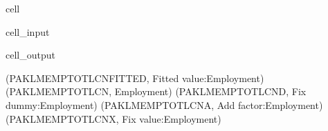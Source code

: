 \documentclass[letterpaper,10pt,english]{jupyterBook}
\begin{document}
\begin{sphinxuseclass}{cell}\begin{sphinxVerbatimInput}

\begin{sphinxuseclass}{cell_input}
\begin{sphinxVerbatim}[commandchars=\\\{\}]
\end{sphinxVerbatim}

\end{sphinxuseclass}\end{sphinxVerbatimInput}
\begin{sphinxVerbatimOutput}

\begin{sphinxuseclass}{cell_output}
\begin{sphinxVerbatim}[commandchars=\\\{\}]
(\PYGZsq{}PAKLMEMPTOTLCN\PYGZus{}FITTED\PYGZsq{}, \PYGZsq{}Fitted  value:Employment\PYGZsq{})
(\PYGZsq{}PAKLMEMPTOTLCN\PYGZsq{}, \PYGZsq{}Employment\PYGZsq{})
(\PYGZsq{}PAKLMEMPTOTLCN\PYGZus{}D\PYGZsq{}, \PYGZsq{}Fix dummy:Employment\PYGZsq{})
(\PYGZsq{}PAKLMEMPTOTLCN\PYGZus{}A\PYGZsq{}, \PYGZsq{}Add factor:Employment\PYGZsq{})
(\PYGZsq{}PAKLMEMPTOTLCN\PYGZus{}X\PYGZsq{}, \PYGZsq{}Fix value:Employment\PYGZsq{})
\end{sphinxVerbatim}

\end{sphinxuseclass}\end{sphinxVerbatimOutput}

\end{sphinxuseclass}
\end{document}
